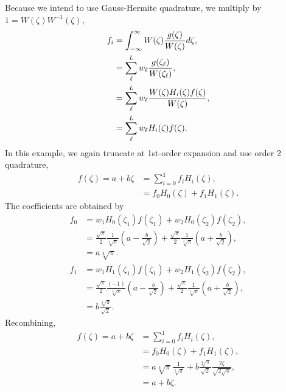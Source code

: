Because we intend to use Gauss-Hermite quadrature, we multiply by $1=W(\zeta)W^{-1}(\zeta)$,
\begin{align}
f_i&=\int_{-\infty}^\infty W(\zeta)\frac{g(\zeta)}{W(\zeta)}d\zeta,\\
  &=\sum_\ell^L w_\ell \frac{g(\zeta_\ell)}{W(\zeta_\ell)},\\
  &=\sum_\ell^L w_\ell \frac{W(\zeta)H_i(\zeta)f(\zeta)}{W(\zeta)},\\
    &=\sum_\ell^L w_\ell H_i(\zeta)f(\zeta).
\end{align}
In this example, we again truncate at 1st-order expansion and use order 2 quadrature,
\begin{align}
f(\zeta)=a+b\zeta&=\sum_{i=0}^{1} f_iH_i(\zeta),\\
  &=f_0H_0(\zeta) + f_1H_1(\zeta).
\end{align}
The coefficients are obtained by
\begin{align}
f_0 &= w_1H_0(\zeta_1)f(\zeta_1) + w_2H_0(\zeta_2)f(\zeta_2),\\
  &= \frac{\sqrt{\pi}}{2}\frac{1}{\sqrt[4]{\pi}}\left(a-\frac{b}{\sqrt{2}}\right) + \frac{\sqrt{\pi}}{2}\frac{1}{\sqrt[4]{\pi}}\left(a+\frac{b}{\sqrt{2}}\right),\\
  &= a\sqrt[4]{\pi}.
\end{align}
\begin{align}
f_1 &= w_1H_1(\zeta_1)f(\zeta_1) + w_2H_1(\zeta_2)f(\zeta_2),\\
  &= \frac{\sqrt{\pi}}{2}\frac{(-1)}{\sqrt[4]{\pi}}\left(a-\frac{b}{\sqrt{2}}\right) + \frac{\sqrt{\pi}}{2}\frac{1}{\sqrt[4]{\pi}}\left(a+\frac{b}{\sqrt{2}}\right),\\
  &= b\frac{\sqrt[4]{\pi}}{\sqrt{2}}.
\end{align}
Recombining,
\begin{align}
f(\zeta)=a+b\zeta&=\sum_{i=0}^{1} f_iH_i(\zeta),\\
  &=f_0H_0(\zeta) + f_1H_1(\zeta),\\
  &= a\sqrt[4]{\pi}\frac{1}{\sqrt[4]{\pi}} + b\frac{\sqrt[4]{\pi}}{\sqrt{2}}\frac{2\zeta}{\sqrt{2\sqrt{\pi}}},\\
  &= a+b\zeta.
\end{align}




\newpage
